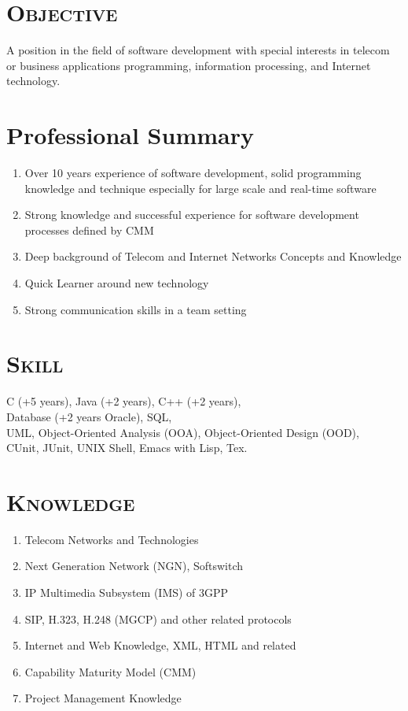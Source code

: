 \documentclass[margin,11pt]{res}
\begin{document}
\begin{resume}
 
\section{\textsc{Objective}}  
A position in the field of software development with special interests in telecom or business
applications programming, information processing, and Internet technology.

\section{Professional Summary}

\begin{enumerate}
    \item Over 10 years experience of software development, solid programming knowledge and
      technique especially for large scale and real-time software
    \item Strong knowledge and successful experience for software development processes defined by CMM
    \item Deep background of Telecom and Internet Networks Concepts and Knowledge
    \item Quick Learner around new technology
    \item Strong communication skills in a team setting
\end{enumerate}

\section{\textsc{Skill}} 
   C (+5 years), Java (+2 years), C++ (+2 years), \\
   Database (+2 years Oracle), SQL,\\
   UML, Object-Oriented Analysis (OOA), Object-Oriented Design (OOD),\\
   CUnit, JUnit, UNIX Shell, Emacs with Lisp, Tex.

\section{\textsc{Knowledge}} 
\begin{enumerate}
    \item Telecom Networks and Technologies
    \item Next Generation Network (NGN), Softswitch
    \item IP Multimedia Subsystem (IMS) of 3GPP
    \item SIP, H.323, H.248 (MGCP) and other related protocols
    \item Internet and Web Knowledge, XML, HTML and related
    \item Capability Maturity Model (CMM)
    \item Project Management Knowledge
\end{enumerate}
 

\end{resume}
\end{document}
